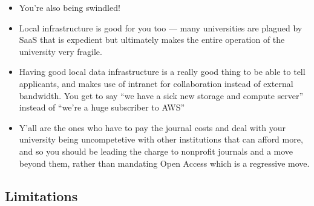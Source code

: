 \documentclass[10pt]{article}
\begin{document}
\begin{multicols}{2}
\begin{itemize}

\item
  You're also being swindled!
\item
  Local infrastructure is good for you too --- many universities are
  plagued by SaaS that is expedient but ultimately makes the entire
  operation of the university very fragile.
\item
  Having good local data infrastructure is a really good thing to be
  able to tell applicants, and makes use of intranet for collaboration
  instead of external bandwidth. You get to say ``we have a sick new
  storage and compute server'' instead of ``we're a huge subscriber to
  AWS''
\item
  Y'all are the ones who have to pay the journal costs and deal with
  your university being uncompetetive with other institutions that can
  afford more, and so you should be leading the charge to nonprofit
  journals and a move beyond them, rather than mandating Open Access
  which is a regressive move. 


\end{itemize}

\end{multicols}


\hypertarget{limitations}{%
\subsection{Limitations}\label{limitations}}
\end{document}
